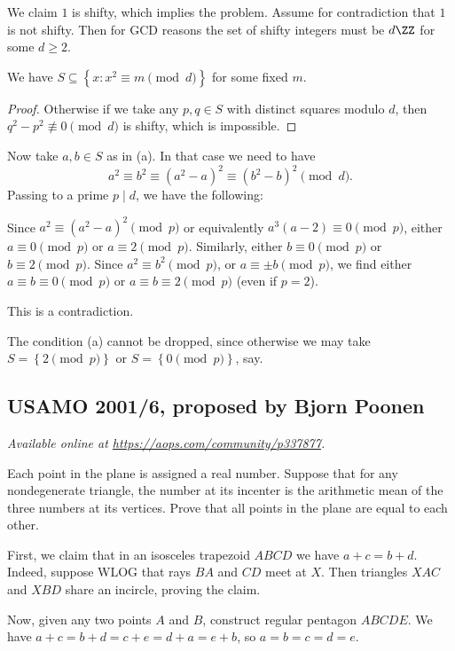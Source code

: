 \documentclass[11pt]{scrartcl}
\begin{document}
We claim $1$ is shifty, which implies the problem.
Assume for contradiction that $1$ is not shifty.
Then for GCD reasons the set of shifty integers must be $d \ZZ$ for some $d \ge 2$.

\begin{claim*}
  We have $S \subseteq \left\{ x : x^2 \equiv m \pmod d \right\}$ for some fixed $m$.
\end{claim*}
\begin{proof}
  Otherwise if we take any $p,q \in S$ with distinct squares modulo $d$,
  then $q^2-p^2 \not\equiv 0 \pmod d$ is shifty, which is impossible.
\end{proof}

Now take $a,b \in S$ as in (a).
In that case we need to have
\[ a^2 \equiv b^2 \equiv (a^2-a)^2 \equiv (b^2-b)^2 \pmod d. \]
Passing to a prime $p \mid d$, we have the following:
\begin{itemize}
  \ii Since $a^2 \equiv (a^2-a)^2 \pmod p$ or equivalently $a^3(a-2) \equiv 0 \pmod p$,
  either $a \equiv 0 \pmod p$ or $a \equiv 2 \pmod p$.
  \ii Similarly, either $b \equiv 0 \pmod p$ or $b \equiv 2 \pmod p$.
  \ii Since $a^2 \equiv b^2 \pmod p$, or $a \equiv \pm b \pmod p$, we find either
  $a \equiv b \equiv 0 \pmod p$ or $a \equiv b \equiv 2 \pmod p$ (even if $p=2$).
\end{itemize}
This is a contradiction.

\begin{remark*}
  The condition (a) cannot be dropped, since otherwise we may take
  $S = \left\{ 2 \pmod p \right\}$ or $S = \left\{ 0 \pmod p \right\}$, say.
\end{remark*}
\pagebreak

\subsection{USAMO 2001/6, proposed by Bjorn Poonen}
\textsl{Available online at \url{https://aops.com/community/p337877}.}
\begin{mdframed}[style=mdpurplebox,frametitle={Problem statement}]
Each point in the plane is assigned a real number.
Suppose that for any nondegenerate triangle, the number at its incenter
is the arithmetic mean of the three numbers at its vertices.
Prove that all points in the plane are equal to each other.
\end{mdframed}
First, we claim that in an isosceles trapezoid $ABCD$ we have $a+c=b+d$.
Indeed, suppose WLOG that rays $BA$ and $CD$ meet at $X$.
Then triangles $XAC$ and $XBD$ share an incircle, proving the claim.

Now, given any two points $A$ and $B$, construct regular pentagon $ABCDE$.
We have $a+c=b+d=c+e=d+a=e+b$, so $a=b=c=d=e$.
\pagebreak
\end{document}
